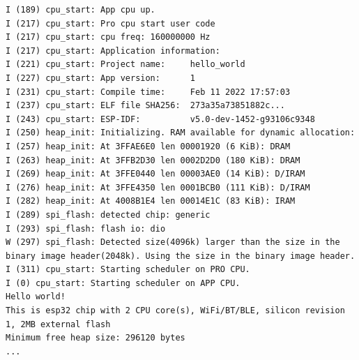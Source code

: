 \begin{enumerate}
\begin{lstlisting}
I (189) cpu_start: App cpu up.
I (217) cpu_start: Pro cpu start user code
I (217) cpu_start: cpu freq: 160000000 Hz
I (217) cpu_start: Application information:
I (221) cpu_start: Project name:     hello_world
I (227) cpu_start: App version:      1
I (231) cpu_start: Compile time:     Feb 11 2022 17:57:03
I (237) cpu_start: ELF file SHA256:  273a35a73851882c...
I (243) cpu_start: ESP-IDF:          v5.0-dev-1452-g93106c9348
I (250) heap_init: Initializing. RAM available for dynamic allocation:
I (257) heap_init: At 3FFAE6E0 len 00001920 (6 KiB): DRAM
I (263) heap_init: At 3FFB2D30 len 0002D2D0 (180 KiB): DRAM
I (269) heap_init: At 3FFE0440 len 00003AE0 (14 KiB): D/IRAM
I (276) heap_init: At 3FFE4350 len 0001BCB0 (111 KiB): D/IRAM
I (282) heap_init: At 4008B1E4 len 00014E1C (83 KiB): IRAM
I (289) spi_flash: detected chip: generic
I (293) spi_flash: flash io: dio
W (297) spi_flash: Detected size(4096k) larger than the size in the binary image header(2048k). Using the size in the binary image header.
I (311) cpu_start: Starting scheduler on PRO CPU.
I (0) cpu_start: Starting scheduler on APP CPU.
Hello world!
This is esp32 chip with 2 CPU core(s), WiFi/BT/BLE, silicon revision 1, 2MB external flash
Minimum free heap size: 296120 bytes
...
\end{lstlisting}
\end{enumerate}